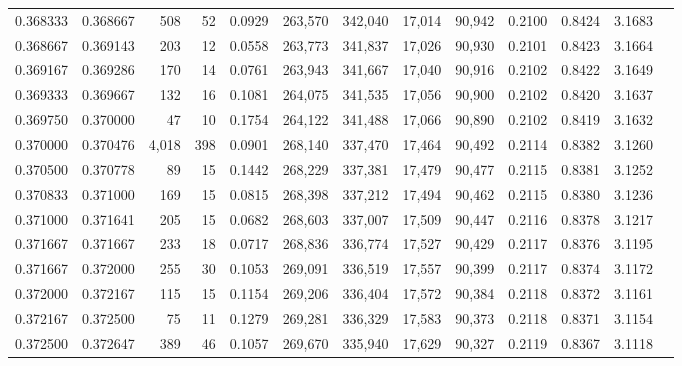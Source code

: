 \begin{tabular}{rrrrrrrrrrrrr}
0.368333 & 0.368667 &   508 &  52 &                                     0.0929 & 263,570 & 342,040 &  17,014 &  90,942 & 0.2100 & 0.8424 & 3.1683 \\
0.368667 & 0.369143 &   203 &  12 &                                     0.0558 & 263,773 & 341,837 &  17,026 &  90,930 & 0.2101 & 0.8423 & 3.1664 \\
0.369167 & 0.369286 &   170 &  14 &                                     0.0761 & 263,943 & 341,667 &  17,040 &  90,916 & 0.2102 & 0.8422 & 3.1649 \\
0.369333 & 0.369667 &   132 &  16 &                                     0.1081 & 264,075 & 341,535 &  17,056 &  90,900 & 0.2102 & 0.8420 & 3.1637 \\
0.369750 & 0.370000 &    47 &  10 &                                     0.1754 & 264,122 & 341,488 &  17,066 &  90,890 & 0.2102 & 0.8419 & 3.1632 \\
0.370000 & 0.370476 & 4,018 & 398 &                                     0.0901 & 268,140 & 337,470 &  17,464 &  90,492 & 0.2114 & 0.8382 & 3.1260 \\
0.370500 & 0.370778 &    89 &  15 &                                     0.1442 & 268,229 & 337,381 &  17,479 &  90,477 & 0.2115 & 0.8381 & 3.1252 \\
0.370833 & 0.371000 &   169 &  15 &                                     0.0815 & 268,398 & 337,212 &  17,494 &  90,462 & 0.2115 & 0.8380 & 3.1236 \\
0.371000 & 0.371641 &   205 &  15 &                                     0.0682 & 268,603 & 337,007 &  17,509 &  90,447 & 0.2116 & 0.8378 & 3.1217 \\
0.371667 & 0.371667 &   233 &  18 &                                     0.0717 & 268,836 & 336,774 &  17,527 &  90,429 & 0.2117 & 0.8376 & 3.1195 \\
0.371667 & 0.372000 &   255 &  30 &                                     0.1053 & 269,091 & 336,519 &  17,557 &  90,399 & 0.2117 & 0.8374 & 3.1172 \\
0.372000 & 0.372167 &   115 &  15 &                                     0.1154 & 269,206 & 336,404 &  17,572 &  90,384 & 0.2118 & 0.8372 & 3.1161 \\
0.372167 & 0.372500 &    75 &  11 &                                     0.1279 & 269,281 & 336,329 &  17,583 &  90,373 & 0.2118 & 0.8371 & 3.1154 \\
0.372500 & 0.372647 &   389 &  46 &                                     0.1057 & 269,670 & 335,940 &  17,629 &  90,327 & 0.2119 & 0.8367 & 3.1118 \\

\end{tabular}
